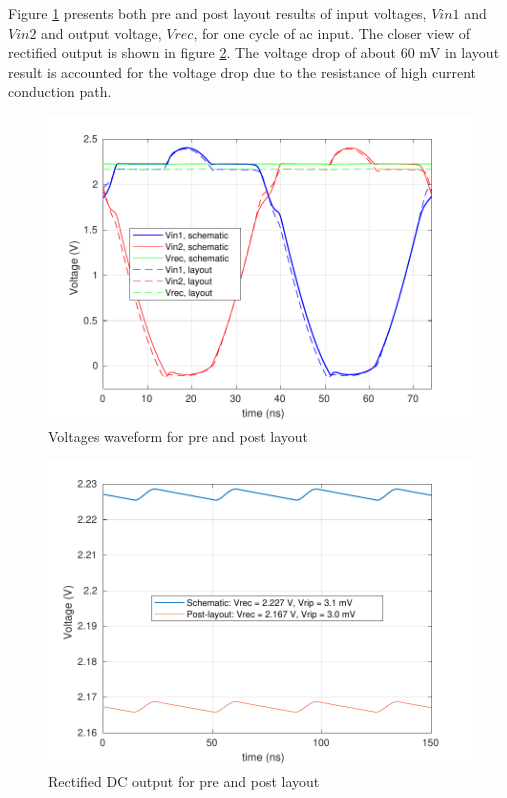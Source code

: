 \documentclass[UKenglish]{ifimaster}  %
\begin{document}
Figure  \ref{fig:rect_v_post}  presents both pre and post layout results of input voltages, $Vin1$ and $Vin2$  and output voltage, $Vrec$, for one cycle of ac input. The closer view of rectified output is shown in figure \ref{fig:rect_ripple}. The voltage drop of about 60 mV in layout result is accounted for the voltage drop due to 
the resistance of high current conduction path. \\

\begin{figure}[H] %
   \centering
   \includegraphics[width=\textwidth]{img/rectifier_V_post.pdf} 
   \caption{Voltages waveform for pre and post layout}
   \label{fig:rect_v_post}
\end{figure}

\begin{figure}[H] %
   \centering
   \includegraphics[width=\textwidth]{img/rectifier_ripple.pdf} 
   \caption{Rectified DC output for pre and post layout}
   \label{fig:rect_ripple}
\end{figure}
\end{document}
